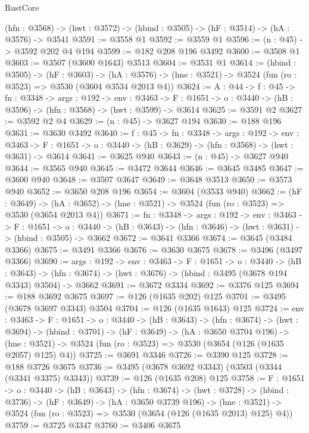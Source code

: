 \begin{lexlean}{RustCore}
\begin{coremodule}
  (hfn : @3568) -> (hwt : @3572) -> (hbind : @3505) -> (hF : @3514) -> (hA : @3576) -> @3541
@3591 := @3558 @1
@3592 := @3559 @1
@3596 := (n : @45) -> @3592 @202 @4 @194
@3599 := @182 @208 @196 @3492
@3600 := @3508 @1
@3603 := @3507 (@3600 @1643) @3513
@3604 := @3531 @1
@3614 := (hbind : @3505) ->
  (hF : @3603) ->
  (hA : @3576) -> (hne : @3521) -> @3524 (fun (ro : @3523) => @3530 (@3604 @3534 @2013 @4))
@3624 := {A : @44} ->
  {f : @45} ->
  {fn : @3348} ->
  {args : @192} ->
  {env : @3463} ->
  {F : @1651} -> {o : @3440} -> (hB : @3596) -> (hfn : @3568) -> (hwt : @3599) -> @3614
@3625 := @3591 @2
@3627 := @3592 @2 @4
@3629 := (n : @45) -> @3627 @194
@3630 := @188 @196
@3631 := @3630 @3492
@3640 := {f : @45} ->
  {fn : @3348} ->
  {args : @192} ->
  {env : @3463} ->
  {F : @1651} -> {o : @3440} -> (hB : @3629) -> (hfn : @3568) -> (hwt : @3631) -> @3614
@3641 := @3625 @940
@3643 := (n : @45) -> @3627 @940
@3644 := @3565 @940
@3645 := @3472 @3644
@3646 := @3645 @3485
@3647 := @3600 @940
@3648 := @3507 @3647
@3649 := @3648 @3513
@3650 := @3573 @940
@3652 := @3650 @208 @196
@3654 := @3604 (@3533 @940)
@3662 := (hF : @3649) ->
  (hA : @3652) -> (hne : @3521) -> @3524 (fun (ro : @3523) => @3530 (@3654 @2013 @4))
@3671 := {fn : @3348} ->
  {args : @192} ->
  {env : @3463} ->
  {F : @1651} ->
  {o : @3440} -> (hB : @3643) -> (hfn : @3646) -> (hwt : @3631) -> (hbind : @3505) -> @3662
@3672 := @3641 @3366
@3674 := @3645 (@3484 @3366)
@3675 := @3491 @3366
@3676 := @3630 @3675
@3678 := @3496 (@3497 @3366)
@3690 := {args : @192} ->
  {env : @3463} ->
  {F : @1651} ->
  {o : @3440} ->
  (hB : @3643) ->
  (hfn : @3674) -> (hwt : @3676) -> (hbind : @3495 (@3678 @194 @3343) @3504) -> @3662
@3691 := @3672 @3334
@3692 := @3376 @125
@3694 := @188 @3692 @3675
@3697 := @126 (@1635 @202) @125
@3701 := @3495 (@3678 @3697 @3343) @3504
@3704 := @126 (@1635 @1643) @125
@3724 := {env : @3463} ->
  {F : @1651} ->
  {o : @3440} ->
  (hB : @3643) ->
  (hfn : @3674) ->
  (hwt : @3694) ->
  (hbind : @3701) ->
  (hF : @3649) ->
  (hA : @3650 @3704 @196) ->
  (hne : @3521) -> @3524 (fun (ro : @3523) => @3530 (@3654 (@126 (@1635 @2057) @125) @4))
@3725 := @3691 @3346
@3726 := @3390 @125
@3728 := @188 @3726 @3675
@3736 := @3495 (@3678 @3692 @3343) (@3503 (@3344 (@3341 @3375) @3343))
@3739 := @126 (@1635 @208) @125
@3758 := {F : @1651} ->
  {o : @3440} ->
  (hB : @3643) ->
  (hfn : @3674) ->
  (hwt : @3728) ->
  (hbind : @3736) ->
  (hF : @3649) ->
  (hA : @3650 @3739 @196) ->
  (hne : @3521) -> @3524 (fun (ro : @3523) => @3530 (@3654 (@126 (@1635 @2013) @125) @4))
@3759 := @3725 @3347
@3760 := @3406 @3675

\end{coremodule}
\end{lexlean}
